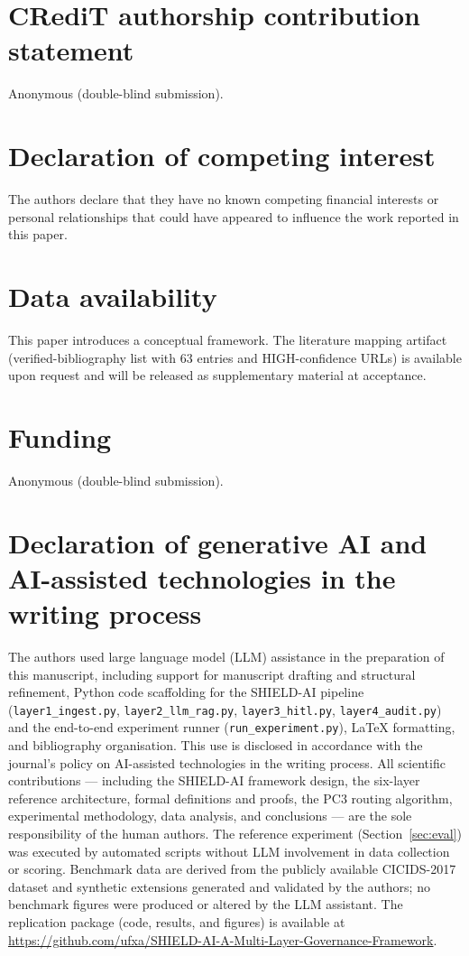 \documentclass[preprint,12pt,authoryear]{elsarticle}
\begin{document}
\section*{CRediT authorship contribution statement}
Anonymous (double-blind submission).

\section*{Declaration of competing interest}
The authors declare that they have no known competing financial interests or personal relationships that could have appeared to influence the work reported in this paper.

\section*{Data availability}
This paper introduces a conceptual framework. The literature mapping artifact (verified-bibliography list with 63 entries and HIGH-confidence URLs) is available upon request and will be released as supplementary material at acceptance.

\section*{Funding}
Anonymous (double-blind submission).

\section*{Declaration of generative AI and AI-assisted technologies in the writing process}
The authors used large language model (LLM) assistance in the preparation of this
manuscript, including support for manuscript drafting and structural refinement,
Python code scaffolding for the SHIELD-AI pipeline
(\texttt{layer1\_ingest.py}, \texttt{layer2\_llm\_rag.py}, \texttt{layer3\_hitl.py},
\texttt{layer4\_audit.py}) and the end-to-end experiment runner
(\texttt{run\_experiment.py}), \LaTeX{} formatting, and bibliography organisation.
This use is disclosed in accordance with the journal's policy on AI-assisted
technologies in the writing process.
All scientific contributions --- including the SHIELD-AI framework design, the
six-layer reference architecture, formal definitions and proofs, the PC3 routing
algorithm, experimental methodology, data analysis, and conclusions --- are the sole
responsibility of the human authors.
The reference experiment (Section~\ref{sec:eval}) was executed by automated scripts
without LLM involvement in data collection or scoring.
Benchmark data are derived from the publicly available CICIDS-2017 dataset and
synthetic extensions generated and validated by the authors; no benchmark figures
were produced or altered by the LLM assistant.
The replication package (code, results, and figures) is available at
\url{https://github.com/ufxa/SHIELD-AI-A-Multi-Layer-Governance-Framework}.
\end{document}
